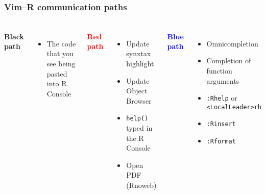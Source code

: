 \documentclass[english,ignorenonframetext]{beamer}
\begin{document}
\begin{frame}
\begin{center}
\end{center}
\end{frame}

\begin{frame}
\frametitle{Vim--R communication paths}
  \frametitle{}
  \begin{columns}
    \textbf{Black path}
    \begin{itemize}
      \item The code that you see being pasted into R Console
    \end{itemize}
    \vspace{0.2cm}
    \textcolor{red}{\textbf{Red path}}
    \begin{itemize}
      \item Update synxtax highlight
      \item Update Object Browser
      \item \texttt{help()} typed in the R Console
      \item Open PDF (Rnoweb)
    \end{itemize}
    \textcolor{blue}{\textbf{Blue path}}
    \begin{itemize}
      \item Omnicompletion
      \item Completion of function arguments
      \item \texttt{:Rhelp} or \texttt{<LocalLeader>rh}
      \item \texttt{:Rinsert}
      \item \texttt{:Rformat}
    \end{itemize}
  \end{columns}
\end{frame}
\end{document}
